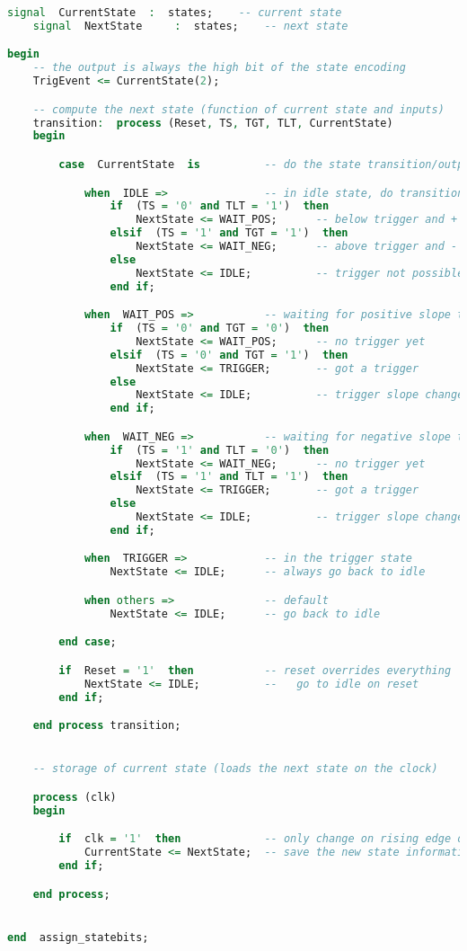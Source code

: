 \begin{lstlisting}[language=vhdl]
    signal  CurrentState  :  states;    -- current state
    signal  NextState     :  states;    -- next state

begin
    -- the output is always the high bit of the state encoding
    TrigEvent <= CurrentState(2);

    -- compute the next state (function of current state and inputs)
    transition:  process (Reset, TS, TGT, TLT, CurrentState)
    begin

        case  CurrentState  is          -- do the state transition/output

            when  IDLE =>               -- in idle state, do transition
                if  (TS = '0' and TLT = '1')  then
                    NextState <= WAIT_POS;      -- below trigger and + slope
                elsif  (TS = '1' and TGT = '1')  then
                    NextState <= WAIT_NEG;      -- above trigger and - slope
                else
                    NextState <= IDLE;          -- trigger not possible yet
                end if;

            when  WAIT_POS =>           -- waiting for positive slope trigger
                if  (TS = '0' and TGT = '0')  then
                    NextState <= WAIT_POS;      -- no trigger yet
                elsif  (TS = '0' and TGT = '1')  then
                    NextState <= TRIGGER;       -- got a trigger
                else
                    NextState <= IDLE;          -- trigger slope changed
                end if;

            when  WAIT_NEG =>           -- waiting for negative slope trigger
                if  (TS = '1' and TLT = '0')  then
                    NextState <= WAIT_NEG;      -- no trigger yet
                elsif  (TS = '1' and TLT = '1')  then
                    NextState <= TRIGGER;       -- got a trigger
                else
                    NextState <= IDLE;          -- trigger slope changed
                end if;

            when  TRIGGER =>            -- in the trigger state
                NextState <= IDLE;      -- always go back to idle

            when others =>              -- default
                NextState <= IDLE;      -- go back to idle

        end case;

        if  Reset = '1'  then           -- reset overrides everything
            NextState <= IDLE;          --   go to idle on reset
        end if;

    end process transition;


    -- storage of current state (loads the next state on the clock)

    process (clk)
    begin

        if  clk = '1'  then             -- only change on rising edge of clock
            CurrentState <= NextState;  -- save the new state information
        end if;

    end process;


end  assign_statebits;
\end{lstlisting}